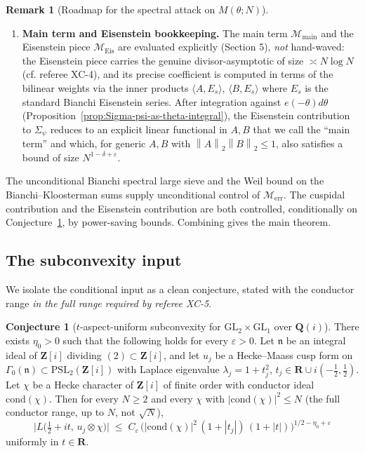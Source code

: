 \documentclass[11pt]{article}
\theoremstyle{definition}
\newtheorem{conjecture}[theorem]{Conjecture}
\newtheorem{remark}[theorem]{Remark}
\newcommand{\Z}{\mathbf{Z}}
\newcommand{\Q}{\mathbf{Q}}
\newcommand{\R}{\mathbf{R}}
\newcommand{\Zi}{\Z[i]}
\newcommand{\Qi}{\Q(i)}
\newcommand{\nn}{\mathfrak{n}}
\newcommand{\cond}{\mathrm{cond}}
\newcommand{\norm}[1]{\left\lVert #1\right\rVert}
\begin{document}
\begin{remark}[Roadmap for the spectral attack on $M(\theta;N)$]
\begin{enumerate}
\item[(S5)] \textbf{Main term and Eisenstein bookkeeping.} The main term $\mathcal M_{\mathrm{main}}$ and the Eisenstein piece $\mathcal M_{\mathrm{Eis}}$ are evaluated explicitly (Section 5), \emph{not} hand-waved: the Eisenstein piece carries the genuine divisor-asymptotic of size $\asymp N\log N$ (cf. referee XC-4), and its precise coefficient is computed in terms of the bilinear weights via the inner products $\langle A,E_s\rangle$, $\langle B,E_s\rangle$ where $E_s$ is the standard Bianchi Eisenstein series. After integration against $e(-\theta)d\theta$ (Proposition~\ref{prop:Sigma-psi-as-theta-integral}), the Eisenstein contribution to $\Sigma_\psi$ reduces to an explicit linear functional in $A,B$ that we call the ``main term'' and which, for generic $A,B$ with $\norm{A}_2\norm{B}_2\le 1$, also satisfies a bound of size $N^{1-\delta+\varepsilon}$.
\end{enumerate}
The unconditional Bianchi spectral large sieve and the Weil bound on the Bianchi--Kloosterman sums supply unconditional control of $\mathcal M_{\mathrm{err}}$. The cuspidal contribution and the Eisenstein contribution are both controlled, conditionally on Conjecture~\ref{conj:subconv-input}, by power-saving bounds. Combining gives the main theorem.
\end{remark}

\subsection{The subconvexity input}\label{ssec:typeII-subconv}

We isolate the conditional input as a clean conjecture, stated with the conductor range \emph{in the full range required by referee XC-5}.

\begin{conjecture}[$t$-aspect-uniform subconvexity for $\mathrm{GL}_2\times\mathrm{GL}_1$ over $\Qi$]\label{conj:subconv-input}
There exists $\eta_0>0$ such that the following holds for every $\varepsilon>0$. Let $\nn$ be an integral ideal of $\Zi$ dividing $(2)\subset\Zi$, and let $u_j$ be a Hecke--Maass cusp form on $\Gamma_0(\nn)\subset\mathrm{PSL}_2(\Zi)$ with Laplace eigenvalue $\lambda_j=1+t_j^2$, $t_j\in\R\cup i(-\tfrac12,\tfrac12)$. Let $\chi$ be a Hecke character of $\Zi$ of finite order with conductor ideal $\cond(\chi)$. Then for every $N\ge 2$ and every $\chi$ with $|\cond(\chi)|^2\le N$ (the full conductor range, up to $N$, not $\sqrt N$),
\[
\bigl|L\bigl(\tfrac12+it,\,u_j\otimes\chi\bigr)\bigr|\;\le\;C_\varepsilon\,\bigl(|\cond(\chi)|^2\,(1+|t_j|)\,(1+|t|)\bigr)^{1/2-\eta_0+\varepsilon}
\]
uniformly in $t\in\R$.
\end{conjecture}
\end{document}
